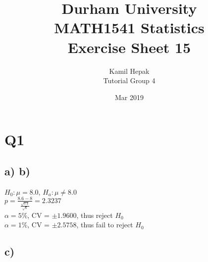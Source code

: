 \documentclass[]{article}
\title{\vspace{-3cm}Durham University\\
    MATH1541 Statistics \\
	Exercise Sheet 15}
\author{Kamil Hepak\\
        Tutorial Group 4}
\date{Mar 2019}
\begin{document}
\maketitle

\section{Q1}
\subsection{a) b)}
$H_0: \mu = 8.0$, $H_a: \mu \neq 8.0$
\\
$p = \frac{8.6-8}{\frac{\sqrt{0.4}}{\sqrt{6}}} = 2.3237$
\\
$\alpha = 5\%$, CV = $\pm 1.9600$, thus reject $H_0$
\\
$\alpha = 1\%$, CV = $\pm 2.5758$, thus fail to reject $H_0$

\subsection{c)}
\end{document}
